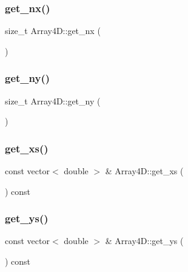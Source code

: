 \subsubsection{\texorpdfstring{get\+\_\+nx()}{get\_nx()}}
{\footnotesize\ttfamily size\+\_\+t Array4\+D\+::get\+\_\+nx (\begin{DoxyParamCaption}{ }\end{DoxyParamCaption})}

\mbox{\label{class_array4_d_a6f75a07d72213eff83aabbfd8442d1d3}} 
\subsubsection{\texorpdfstring{get\+\_\+ny()}{get\_ny()}}
{\footnotesize\ttfamily size\+\_\+t Array4\+D\+::get\+\_\+ny (\begin{DoxyParamCaption}{ }\end{DoxyParamCaption})}

\mbox{\label{class_array4_d_a5b72fa60e0feacd807d4d2e7bd1bf5fd}} 
\subsubsection{\texorpdfstring{get\+\_\+xs()}{get\_xs()}}
{\footnotesize\ttfamily const vector$<$ double $>$ \& Array4\+D\+::get\+\_\+xs (\begin{DoxyParamCaption}{ }\end{DoxyParamCaption}) const}

\mbox{\label{class_array4_d_a3f6fa1fc8bc07a3aa51cbdada40e25e7}} 
\subsubsection{\texorpdfstring{get\+\_\+ys()}{get\_ys()}}
{\footnotesize\ttfamily const vector$<$ double $>$ \& Array4\+D\+::get\+\_\+ys (\begin{DoxyParamCaption}{ }\end{DoxyParamCaption}) const}

\mbox{\label{class_array4_d_ae059c2a19884a0d4e45995e997b55dfe}} 
